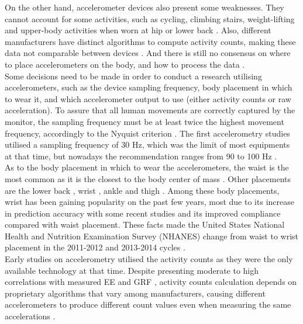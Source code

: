 \documentclass[11pt]{article}
\begin{document}
On the other hand, accelerometer devices also present some weaknesses. They cannot account for some activities, such as cycling, climbing stairs, weight-lifting and upper-body activities when worn at hip or lower back \cite{Strath_2013}. Also, different manufacturers have distinct algorithms to compute activity counts, making these data not comparable between devices \cite{Plasqui_2013}. And there is still no consensus on where to place accelerometers on the body, and how to process the data \cite{Troiano_2014}. \\

Some decisions need to be made in order to conduct a research utilising accelerometers, such as the device sampling frequency, body placement in which to wear it, and which accelerometer output to use (either activity counts or raw acceleration). To assure that all human movements are correctly captured by the monitor, the sampling frequency must be at least twice the highest movement frequency, accordingly to the Nyquist criterion \cite{Chen_2012}. The first accelerometry studies utilised a sampling frequency of 30 Hz, which was the limit of most equipments at that time, but nowadays the recommendation ranges from 90 to 100 Hz \cite{Migueles_2017}. \\

As to the body placement in which to wear the accelerometers, the waist is the most common as it is the closest to the body center of mass \cite{Chen_2005, Mendes_2018}. Other placements are the lower back \cite{Brandes_2012}, wrist \cite{Hildebrand_2017}, ankle \cite{Fortune_2014} and thigh \cite{Montoye_2016}. Among these body placements, wrist has been gaining popularity on the past few years, most due to its increase in prediction accuracy with  some recent studies \cite{Phillips_2013, Hildebrand_2017} and its improved compliance compared with waist placement. These facts made the United States National Health and Nutrition Examination Survey (NHANES) change from waist to wrist placement in the 2011-2012 and 2013-2014 cycles \cite{Troiano_2014}. \\

Early studies on accelerometry utilised the activity counts as they were the only available technology at that time. Despite presenting moderate to high correlations with measured EE \cite{Nichols_1999, Freedson_1998} and GRF \cite{Janz_2003}, activity counts calculation depends on proprietary algorithms that vary among manufacturers, causing different accelerometers to produce different count values even when measuring the same accelerations \cite{Chen_2012, Plasqui_2013}. \\
\end{document}
